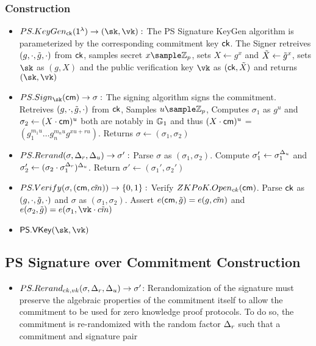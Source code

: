 \subsubsection{Construction}
\begin{itemize}
    \item $PS.KeyGen_{\ck}(\secparam) \to (\sk, \vk):$ The PS Signature KeyGen algorithm is parameterized by the corresponding commitment key $\mathsf{ck}$. The Signer retreives $(g, \cdot, \tilde{g}, \cdot)$ from $\mathsf{ck}$, samples secret $x \sample \Zp$, sets $X \gets g^x$ and $\tilde{X} \gets \tilde{g}^x$, sets $\sk$ as $(g, X)$ and the public verification key $\vk$ as $(\mathsf{ck}, \tilde{X})$ and returns $(\sk, \vk)$

    \item $PS.Sign_{\sk}(\cm) \to \sigma: $ The signing algorithm signs the commitment. Retreives $(g, \cdot, \tilde{g}, \cdot)$ from $\mathsf{ck}$, Samples $u \sample \Zp$, Computes $\sigma_1$ as $g^u$ and $\sigma_2 \gets (X \cdot \mathsf{cm})^u$ both are notably in $\mathbb{G}_1$ and thus $(X \cdot \mathsf{cm})^u$ = $(g_1^{m_1u}\dots g_n^{m_nu}g^{xu+ru})$. Returns $\sigma \gets (\sigma_1, \sigma_2)$    

    \item $PS.Rerand(\sigma, \Delta_r, \Delta_u) \to \sigma':$ Parse $\sigma$ as $(\sigma_1, \sigma_2)$. Compute $\sigma_1' \gets \sigma_1^{\Delta_u}$ and $\sigma_2' \gets (\sigma_2 \cdot \sigma_1^{\Delta_r})^{\Delta_u}$. Return $\sigma' \gets (\sigma_1', \sigma_2')$

    \item $PS.Verify(\sigma, (\mathsf{cm}, \tilde{cm})) \to \{0,1\}:$ Verify $ZKPoK.Open_{ck}(\mathsf{cm})$. Parse $\mathsf{ck}$ as $(g, \cdot, \tilde{g}, \cdot)$ and $\sigma$ as $(\sigma_1, \sigma_2)$. Assert $e(\mathsf{cm}, \tilde{g}) = e(g, \tilde{cm})$ and $e(\sigma_2, \tilg) = e(\sigma_1, \vk \cdot \tilcm)$

    \item $\mathsf{PS.VKey}(\sk, \vk)$ 

\end{itemize}


\subsection{PS Signature over Commitment Construction}
\begin{itemize}
    \item $PS.Rerand_{ck,vk}(\sigma, \Delta_r, \Delta_u) \to \sigma'$: Rerandomization of the signature must preserve the algebraic properties of the commitment itself to allow the commitment to be used for zero knowledge proof protocols. To do so, the commitment is re-randomized with the random factor $\Delta_r$ such that a commitment and signature pair 
\end{itemize}




